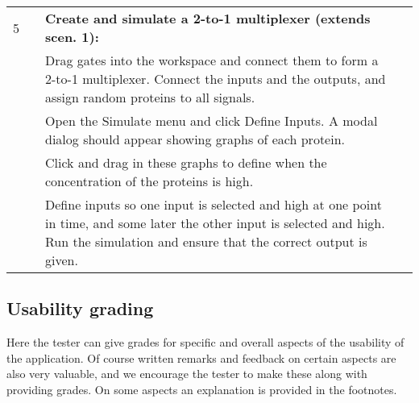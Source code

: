 \documentclass{article}
\newcounter{step}
\newcommand{\step}{\arabic{step}\stepcounter{step}}
\begin{document}
\begin{center}
\begin{longtable}{r r  p{} l }
5 &\setcounter{step}{1}& \textbf{Create and simulate a 2-to-1 multiplexer (extends scen. 1):}\\
&\step& Drag gates into the workspace and connect them to form a 2-to-1 multiplexer. Connect the inputs and the outputs, and assign random proteins to all signals.\\
&\step& Open the Simulate menu and click Define Inputs. A modal dialog should appear showing graphs of each protein.\\
&\step& Click and drag in these graphs to define when the concentration of the proteins is high.\\
&\step& Define inputs so one input is selected and high at one point in time, and some later the other input is selected and high. Run the simulation and ensure that the correct output is given. \\

\end{longtable}
\end{center}

\newpage
\subsection{Usability grading}
Here the tester can give grades for specific and overall aspects of the usability of the application. Of course written remarks and feedback on certain aspects are also very valuable, and we encourage the tester to make these along with providing grades. On some aspects an explanation is provided in the footnotes.
\end{document}
